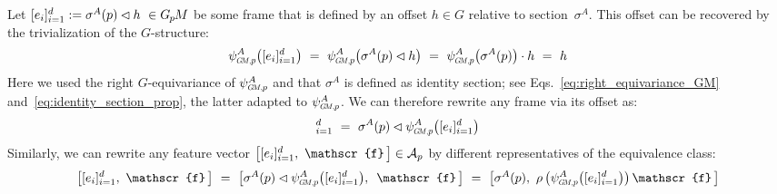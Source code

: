 Let $[e_{i}]_{i=1}^d := \sigma^A(p)\lhd h\ \in \GpM$ be some frame that is defined by an offset $h\in G$ relative to section~$\sigma^A$.
This offset can be recovered by the trivialization of the $G$-structure:
\begin{align}
    \psiGMp^A \!\left([e_{i}]_{i=1}^d\right)
    \ =\ \psiGMp^A \!\left( \sigma^A(p)\lhd h \right)
    \ =\ \psiGMp^A \!\left( \sigma^A(p) \right) \cdot h
    \ =\ h
\end{align}
Here we used the right $G$-equivariance of $\psiGMp^A$ and that $\sigma^A$ is defined as identity section; see Eqs.~\eqref{eq:right_equivariance_GM} and~\eqref{eq:identity_section_prop}, the latter adapted to $\psiGMp^A$.
We can therefore rewrite any frame via its offset as:
\begin{align}
    [e_{i}]_{i=1}^d
    \ =\ \sigma^A(p) \lhd \psiGMp^A \!\left([e_{i}]_{i=1}^d\right)
\end{align}
Similarly, we can rewrite any feature vector $\big[ [e_{i}]_{i=1}^d,\ \mathscr{f}\,\big]\in\A_p$ by different representatives of the equivalence class:
\begin{align}
    \left[ [e_{i}]_{i=1}^d,\ \mathscr{f}\,\right]
    \ =\ \left[ \sigma^A(p) \lhd \psiGMp^A\big([e_{i}]_{i=1}^d\big),\,\ \mathscr{f}\,\right]
    \ =\ \left[ \sigma^A(p),\ \rho\left(\psiGMp^A\big([e_{i}]_{i=1}^d\big)\right) \mathscr{f}\,\right]
\end{align}

